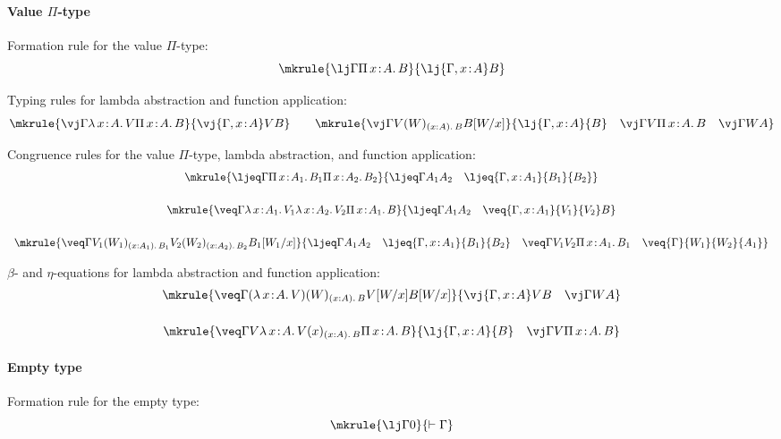\paragraph*{Value $\Pi$-type} \mbox{}

\noindent
Formation rule for the value $\Pi$-type:
\[
\mkrule
{\lj \Gamma {\Pi \, x \!:\! A .\, B}}
{\lj {\Gamma, x \!:\! A} B}
\]

\noindent
Typing rules for lambda abstraction and function application:
\[
\mkrule
{\vj \Gamma {\lambda \, x \!:\! A .\, V} {\Pi \, x \!:\! A .\, B}}
{\vj {\Gamma, x \!:\! A} V B}
\qquad
\mkrule
{\vj \Gamma {V(W)_{(x : A).\, B}} {B[W/x]}}
{\lj {\Gamma, x \!:\! A} {B} \quad \vj \Gamma V {\Pi \, x \!:\! A .\, B} \quad \vj \Gamma W A}
\]

\noindent
Congruence rules for the value $\Pi$-type, lambda abstraction, and function application:
\[
\begin{array}{c}
\mkrule
{\ljeq \Gamma {\Pi \, x \!:\! A_1 .\, B_1} {\Pi \, x \!:\! A_2 .\, B_2}}
{\ljeq \Gamma {A_1} {A_2} \quad \ljeq {\Gamma, x \!:\! A_1} {B_1} {B_2}}
\\[6mm]
\mkrule
{\veq \Gamma {\lambda \, x \!:\! A_1 .\, V_1} {\lambda \, x \!:\! A_2 .\, V_2} {\Pi \, x \!:\! A_1 .\, B}}
{\ljeq \Gamma {A_1} {A_2} \quad \veq {\Gamma, x \!:\! A_1} {V_1} {V_2} B}
\\[6mm]
\mkrule
{\veq \Gamma {V_1(W_1)_{(x : A_1).\, B_1}} {V_2(W_2)_{(x : A_2).\, B_2}} {B_1[W_1/x]}}
{\ljeq \Gamma {A_1} {A_2} \quad \ljeq {\Gamma, x \!:\! A_1} {B_1} {B_2} \quad \veq \Gamma {V_1} {V_2} {\Pi \, x \!:\! A_1 .\, B_1} \quad \veq {\Gamma} {W_1} {W_2} {A_1}}
\end{array}
\]

\noindent
$\beta$- and $\eta$-equations for lambda abstraction and function application:
\[
\begin{array}{c}
\mkrule
{\veq \Gamma {(\lambda \, x \!:\! A .\, V)(W)_{(x : A) .\, B}} {V[W/x]} {B[W/x]}}
{\vj {\Gamma, x \!:\! A} V B \quad \vj \Gamma W A}
\\[6mm]
\mkrule
{\veq \Gamma {V} {\lambda \, x \!:\! A .\, V(x)_{(x : A) .\, B}} {\Pi \, x \!:\! A .\, B}}
{\lj {\Gamma, x \!:\! A} {B} \quad \vj \Gamma V {\Pi \, x \!:\! A .\, B}}
\end{array}
\]


\paragraph*{Empty type} \mbox{}

\noindent
Formation rule for the empty type:
\[
\mkrule
{\lj \Gamma 0}
{\vdash \Gamma}
\]

